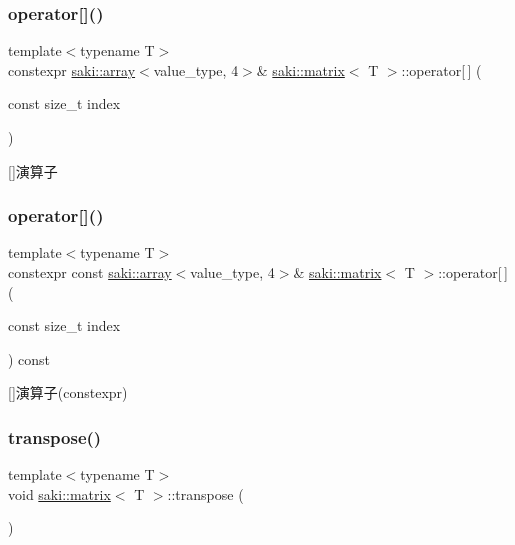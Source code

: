 \subsubsection{\texorpdfstring{operator[]()}{operator[]()}\hspace{0.1cm}{\footnotesize\ttfamily [1/2]}}
{\footnotesize\ttfamily template$<$typename T$>$ \\
constexpr \mbox{\hyperlink{classsaki_1_1array}{saki\+::array}}$<$value\+\_\+type, 4$>$\& \mbox{\hyperlink{classsaki_1_1matrix}{saki\+::matrix}}$<$ T $>$\+::operator\mbox{[}$\,$\mbox{]} (\begin{DoxyParamCaption}\item[{const size\+\_\+t}]{index }\end{DoxyParamCaption})\hspace{0.3cm}{\ttfamily [inline]}}



\mbox{[}\mbox{]}演算子 

\mbox{\label{classsaki_1_1matrix_a1a326fe310df8da04d32200dd6ae1e64}} 
\subsubsection{\texorpdfstring{operator[]()}{operator[]()}\hspace{0.1cm}{\footnotesize\ttfamily [2/2]}}
{\footnotesize\ttfamily template$<$typename T$>$ \\
constexpr const \mbox{\hyperlink{classsaki_1_1array}{saki\+::array}}$<$value\+\_\+type, 4$>$\& \mbox{\hyperlink{classsaki_1_1matrix}{saki\+::matrix}}$<$ T $>$\+::operator\mbox{[}$\,$\mbox{]} (\begin{DoxyParamCaption}\item[{const size\+\_\+t}]{index }\end{DoxyParamCaption}) const\hspace{0.3cm}{\ttfamily [inline]}}



\mbox{[}\mbox{]}演算子(constexpr) 

\mbox{\label{classsaki_1_1matrix_a95e01e24e45757c1e45b5af25273a8fa}} 
\subsubsection{\texorpdfstring{transpose()}{transpose()}}
{\footnotesize\ttfamily template$<$typename T$>$ \\
void \mbox{\hyperlink{classsaki_1_1matrix}{saki\+::matrix}}$<$ T $>$\+::transpose (\begin{DoxyParamCaption}{ }\end{DoxyParamCaption})\hspace{0.3cm}{\ttfamily [inline]}}



